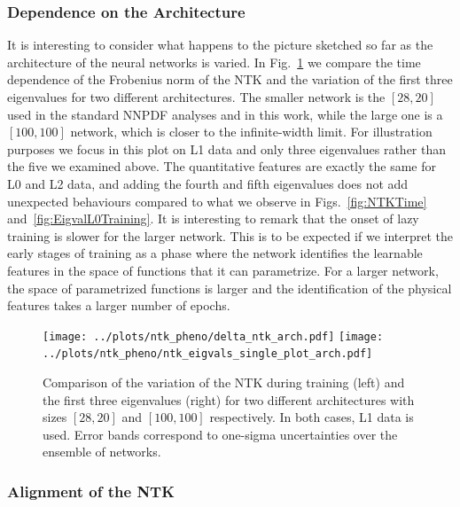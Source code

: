 \FloatBarrier

\subsubsection{Dependence on the Architecture}
\label{sec:DepOnArch}

It is interesting to consider what happens to the picture sketched so far as the
architecture of the neural networks is varied. In Fig.~\ref{fig:NTKTimeDiffArch}
we compare the time dependence of the Frobenius norm of the NTK and the
variation of the first three eigenvalues for two different architectures. The
smaller network is the $[28,20]$ used in the standard NNPDF analyses and in this
work, while the large one is a $[100,100]$ network, which is closer to the
infinite-width limit. For illustration purposes we focus in this plot on L1 data
and only three eigenvalues rather than the five we examined above. The
quantitative features are exactly the same for L0 and L2 data, and adding the
fourth and fifth eigenvalues does not add unexpected behaviours compared to what
we observe in Figs.~\ref{fig:NTKTime} and~\ref{fig:EigvalL0Training}. It is
interesting to remark that the onset of lazy training is slower for the larger
network. This is to be expected if we interpret the early stages of training as
a phase where the network identifies the learnable features in the space of
functions that it can parametrize. For a larger network, the space of
parametrized functions is larger and the identification of the physical features
takes a larger number of epochs. 
\begin{figure}[ht!]
  \centering
  \texttt{[image: ../plots/ntk\_pheno/delta\_ntk\_arch.pdf]}
  \texttt{[image: ../plots/ntk\_pheno/ntk\_eigvals\_single\_plot\_arch.pdf]}
  \caption{Comparison of the variation of the NTK during training (left) and the
  first three eigenvalues (right) for two different architectures with sizes
  $[28,20]$ and $[100,100]$ respectively. In both cases, L1 data is used. Error
  bands correspond to one-sigma uncertainties over the ensemble of networks.}
  \label{fig:NTKTimeDiffArch}
\end{figure}

\FloatBarrier

\subsubsection{Alignment of the NTK}
\label{sec:NTKAlign}

